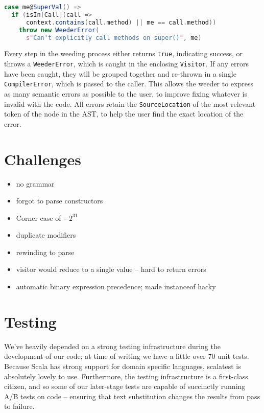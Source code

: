 \documentclass{article}
\begin{document}
\begin{lstlisting}[language=Scala]
case me@SuperVal() =>
  if (isIn[Call](call =>
      context.contains(call.method) || me == call.method))
    throw new WeederError(
      s"Can't explicitly call methods on super()", me)
\end{lstlisting}

Every step in the weeding process either returns {\tt true}, indicating success,
or throws a {\tt WeederError}, which is caught in the enclosing {\tt Visitor}. If any
errors have been caught, they will be grouped together and re-thrown in a single
{\tt CompilerError}, which is passed to the caller. This allows the weeder to express
as many semantic errors as possible to the user, to improve fixing whatever is invalid
with the code. All errors retain the {\tt SourceLocation} of the most relevant token of the
node in the AST, to help the user find the exact location of the error.



\section{Challenges}

\begin{itemize}
    \item no grammar
    \item forgot to parse constructors
    \item Corner case of $-2^{31}$
    \item duplicate modifiers
    \item rewinding to parse
    \item visitor would reduce to a single value -- hard to return errors
    \item automatic binary expression precedence; made instanceof hacky
\end{itemize}




\section{Testing}

We've heavily depended on a strong testing infrastructure during the development of our code; at time of writing we have
a little over 70 unit tests. Because Scala has strong support for domain specific languages, scalatest is absolutely
lovely to use. Furthermore, the testing infrastructure is a first-class citizen, and so some of our later-stage tests
are capable of succinctly running A/B tests on code -- ensuring that text substitution changes the results from pass to
failure.
\end{document}
